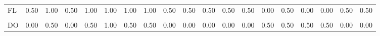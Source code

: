 \begin{table}[H]
{\begin{tabular}[t]{lrrrrrrrrrrrrrrrrrr}
\addlinespace
FL & 0.50 & 1.00 & 0.50 & 1.00 & 1.00 & 1.00 & 1.00 & 0.50 & 0.50 & 0.50 & 0.50 & 0.50 & 0.00 & 0.50 & 0.00 & 0.00 & 0.50 & 0.50\\
\cellcolor{gray!6}{PE} & \cellcolor{gray!6}{0.00} & \cellcolor{gray!6}{0.33} & \cellcolor{gray!6}{0.00} & \cellcolor{gray!6}{0.33} & \cellcolor{gray!6}{1.00} & \cellcolor{gray!6}{0.33} & \cellcolor{gray!6}{0.33} & \cellcolor{gray!6}{0.33} & \cellcolor{gray!6}{0.33} & \cellcolor{gray!6}{0.33} & \cellcolor{gray!6}{0.33} & \cellcolor{gray!6}{0.33} & \cellcolor{gray!6}{0.67} & \cellcolor{gray!6}{0.67} & \cellcolor{gray!6}{0.67} & \cellcolor{gray!6}{0.67} & \cellcolor{gray!6}{0.00} & \cellcolor{gray!6}{0.33}\\
DO & 0.00 & 0.50 & 0.00 & 0.50 & 1.00 & 0.50 & 0.50 & 0.00 & 0.00 & 0.00 & 0.00 & 0.00 & 0.50 & 0.50 & 0.50 & 0.50 & 0.00 & 0.00\\
\bottomrule
\end{tabular}}
\end{table}
